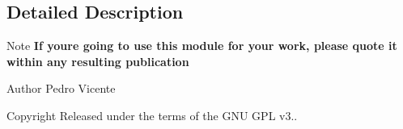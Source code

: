 \subsection{Detailed Description}
\begin{DoxyNote}{Note}
{\bfseries If you\textquotesingle{}re going to use this module for your work, please quote it within any resulting publication}
\end{DoxyNote}
\begin{DoxyAuthor}{Author}
Pedro Vicente 
\end{DoxyAuthor}
\begin{DoxyCopyright}{Copyright}
Released under the terms of the G\+NU G\+PL v3.. 
\end{DoxyCopyright}
